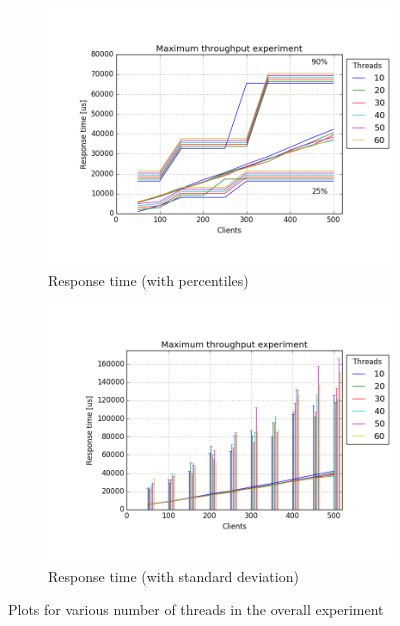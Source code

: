 \documentclass[11pt]{article}
\begin{document}
\begin{figure}

\begin{subfigure}{\textwidth}
	\centering
	\includegraphics[width=0.95\linewidth]{plots/max_throughput-response_time_all_overall}
	\caption{Response time (with percentiles)}
\end{subfigure}
\begin{subfigure}{\textwidth}
	\centering
	\includegraphics[width=0.95\linewidth]{plots/max_throughput-response_time_all_overall_std}
	\caption{Response time (with standard deviation)}
\end{subfigure}
\caption{Plots for various number of threads in the overall experiment}
\label{fig:max-throughput-overall-time}
\end{figure}
\end{document}
